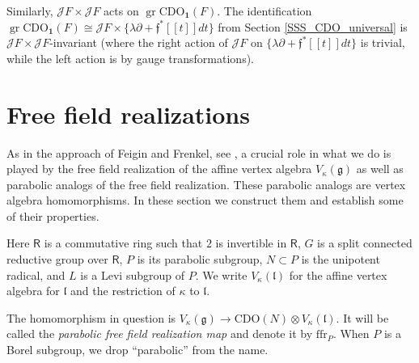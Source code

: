 \documentclass{amsart}
\theoremstyle{definition}
\newcommand{\Ring}{\mathsf{R}}
\newcommand{\g}{\mathfrak{g}}
\newcommand{\gr}{\operatorname{gr}}
\newcommand{\ffr}{\mathrm{ffr}}
\newcommand{\lf}{\mathfrak{l}}
\newcommand{\Jet}{\mathscr{J}}
\newcommand{\ff}{\mathfrak{f}}
\newcommand{\CDO}{\mathrm{CDO}}
\newcommand{\bone}{\mathbf{1}}
\numberwithin{equation}{section}
\begin{document}
Similarly, $\Jet F\times \Jet F$ acts on $\gr \CDO_{\bone}(F)$. The identification $\gr \CDO_{\bone}(F)\cong \Jet F\times \{\lambda\partial+\ff^*[[t]]dt\}$ from Section \ref{SSS_CDO_universal} is $\Jet F\times \Jet F$-invariant (where the right action of $\Jet F$ on 
$\{\lambda\partial+\ff^*[[t]]dt\}$ is trivial, while the left action is by gauge transformations). 





\section{Free field realizations}\label{S_CDO_ffr}
As in the approach of Feigin and Frenkel, see \cite{Frenkel_loop}, 
a crucial role in what we do is played by the free field realization of the affine vertex algebra $V_\kappa(\g)$ as well as parabolic analogs of the free field realization. These parabolic analogs are vertex algebra homomorphisms. In these section we construct them and establish some of their properties. 

Here $\Ring$ is a commutative ring such that $2$ is invertible in $\Ring$, $G$ is a split connected reductive group over $\Ring$, $P$ is its parabolic subgroup, $N\subset P$ is the unipotent radical, and $L$ is a Levi subgroup of $P$. We write $V_\kappa(\lf)$ for the affine vertex algebra for $\lf$ and the restriction of $\kappa$ to $\lf$. 

The homomorphism in question is $V_\kappa(\g)\rightarrow \CDO(N)\otimes V_\kappa(\lf)$. It will be called the {\it parabolic free field realization map} and denote it by $\ffr_P$. When $P$ is a Borel subgroup, we drop ``parabolic'' from the name. 


\end{document}
